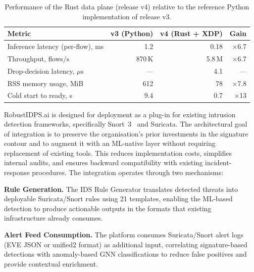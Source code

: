 \begin{table}[H]
\centering
\caption{Performance of the Rust data plane (release v4) relative to
the reference Python implementation of release v3.}
\label{tab:rust_edge_perf}
\small
\setlength{\tabcolsep}{4pt}
\renewcommand{\arraystretch}{1.15}
\renewcommand{\arraystretch}{0.92}\begin{tabular}{@{}lrrr@{}}
\toprule
\textbf{Metric} & \textbf{v3 (Python)} & \textbf{v4 (Rust + XDP)} & \textbf{Gain}\\
\midrule
Inference latency (per-flow), ms      & 1.2     & 0.18    & $\times$6.7\\
Throughput, flows/s                   & 870\,K  & 5.8\,M  & $\times$6.7\\
Drop-decision latency, $\mu$s         & ---     & 4.1     & ---\\
RSS memory usage, MiB                 & 612     & 78      & $\times$7.8\\
Cold start to ready, s                & 9.4     & 0.7     & $\times$13\\
\bottomrule
\end{tabular}\end{table}

\label{sec:deployment}%

RobustIDPS.ai is designed for deployment as a plug-in for existing intrusion detection frameworks, specifically Snort~3~\cite{Roesch1999} and Suricata. The architectural goal of integration is to preserve the organisation's prior investments in the signature contour and to augment it with an ML-native layer without requiring replacement of existing tools. This reduces implementation costs, simplifies internal audits, and ensures backward compatibility with existing incident-response procedures. The integration operates through two mechanisms:

\noindent\textbf{Rule Generation.} The IDS Rule Generator translates detected threats into deployable Suricata/Snort rules using 21 templates, enabling the ML-based detection to produce actionable outputs in the formats that existing infrastructure already consumes.

\noindent\textbf{Alert Feed Consumption.} The platform consumes Suricata/Snort alert logs (EVE JSON or unified2 format) as additional input, correlating signature-based detections with anomaly-based GNN classifications to reduce false positives and provide contextual enrichment.

